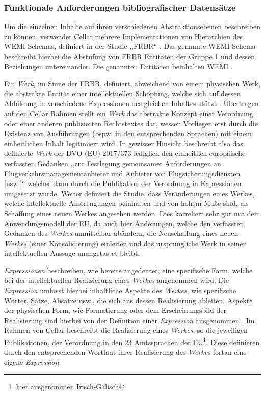 \subsubsection{Funktionale Anforderungen bibliografischer Datensätze}\label{frbr}
        
    Um die einzelnen Inhalte auf ihren verschiedenen Abstraktionsebenen beschreiben zu können, verwendet Cellar mehrere Implementationen von Hierarchien des \acs{WEMI} Schemas, definiert in der Studie ,,\ac{FRBR}`` \cite[S. 29f]{eu_cellar}.
    Das genannte \acs{WEMI}-Schema beschreibt hierbei die Abstufung von \ac{FRBR} Entitäten der Gruppe 1 und dessen Beziehungen untereinander. 
    Die genannten Entitäten beinhalten \ac{WEMI} \cite[12]{eu_frbr}.

    \medskip
    Ein \textit{Werk}, im Sinne der \ac{FRBR}, definiert, abweichend von einem physischen Werk, die abstrakte Entität einer intellektuellen Schöpfung, welche sich auf dessen Abbildung in verschiedene Expressionen des gleichen Inhaltes stützt 
    \cite[S. 16f]{eu_frbr}.
    Übertragen auf den Cellar Rahmen stellt ein \textit{Werk} das abstrakte Konzept einer Verordnung oder einer anderen publizierten Rechtstextes dar, wessen Vorliegen erst durch die Existenz von Ausführungen (bspw. in den entsprechenden Sprachen) mit einem einheitlichen Inhalt legitimiert wird. 
    In gewisser Hinsicht beschreibt also das definierte \textit{Werk} der \acs{DVO} (\acs{EU}) 2017/373 lediglich den einheitlich europäische verfassten Gedanken ,,zur Festlegung gemeinsamer Anforderungen an Flugverkehrsmanagementanbieter und Anbieter von Flugsicherungsdiensten [usw.]`` welcher dann durch die Publikation der Verordnung in Expressionen umgesetzt wurde.
    Weiter definiert die Studie, dass Veränderungen eines Werkes, welche intellektuelle Anstrengungen beinhalten und von hohem Maße sind, als Schaffung eines neuen Werkes angesehen werden. \cite[17]{eu_frbr} 
    Dies korreliert sehr gut mit dem Anwendungsmodell der \ac{EU}, da auch hier Änderungen, welche den verfassten Gedanken des \textit{Werkes} unmittelbar abändern, die Neuschaffung eines neuen \textit{Werkes} (einer Konsolidierung) einleiten und das ursprüngliche Werk in seiner intellektuellen Aussage unangetastet bleibt.
    
    \medskip
    \textit{Expressionen} beschreiben, wie bereits angedeutet, eine spezifische Form, welche bei der intellektuellen Realisierung eines \textit{Werkes} angenommen wird.
    Die \textit{Expression} umfasst hierbei inhaltliche Aspekte des \textit{Werkes}, wie spezifische Wörter, Sätze, Absätze usw., die sich aus dessen Realisierung ableiten. 
    Aspekte der physischen Form, wie Formatierung oder dem Erscheinungsbild der Realisierung sind hierbei von der Definition einer \textit{Expression} ausgenommen \cite[S. 18f]{eu_frbr}.
    Im Rahmen von Cellar beschreibt die Realisierung eines \textit{Werkes}, so die jeweiligen Publikationen, der Verordnung in den 23 Amtssprachen der EU\footnote{hier ausgenommen Irisch-Gälisch}.
    Diese definieren durch den entsprechenden Wortlaut ihrer Realisierung des \textit{Werkes} fortan eine eigene \textit{Expression}.
    
